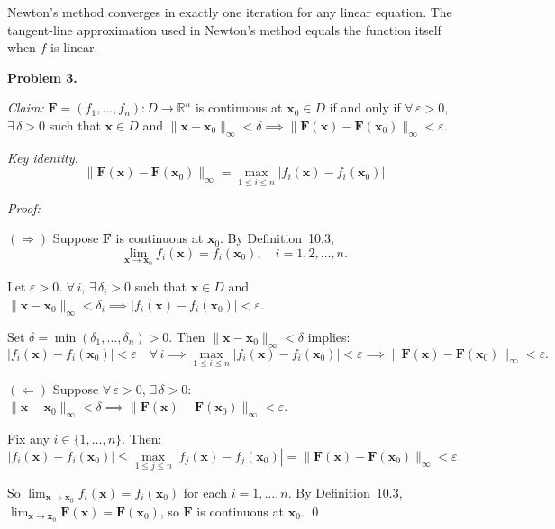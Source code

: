 \documentclass[12pt,letterpaper]{article}
\begin{document}
Newton's method converges in exactly one iteration for any linear equation. The tangent-line approximation used in Newton's method equals the function itself when $f$ is linear.



\textbf{Problem 3.}

\textit{Claim:} $\mathbf{F} = (f_1, \ldots, f_n) : D \to \mathbb{R}^n$ is continuous at $\mathbf{x}_0 \in D$ if and only if $\forall\, \varepsilon > 0$, $\exists\, \delta > 0$ such that $\mathbf{x} \in D$ and $\|\mathbf{x} - \mathbf{x}_0\|_\infty < \delta \implies \|\mathbf{F}(\mathbf{x}) - \mathbf{F}(\mathbf{x}_0)\|_\infty < \varepsilon$.

\textit{Key identity.}
\[
\|\mathbf{F}(\mathbf{x}) - \mathbf{F}(\mathbf{x}_0)\|_\infty = \max_{1 \le i \le n} |f_i(\mathbf{x}) - f_i(\mathbf{x}_0)|
\]

\textit{Proof:}

$(\Longrightarrow)$ Suppose $\mathbf{F}$ is continuous at $\mathbf{x}_0$. By Definition~10.3,
\[
\lim_{\mathbf{x} \to \mathbf{x}_0} f_i(\mathbf{x}) = f_i(\mathbf{x}_0), \quad i = 1, 2, \ldots, n.
\]

Let $\varepsilon > 0$. $\forall\, i$, $\exists\, \delta_i > 0$ such that $\mathbf{x} \in D$ and $\|\mathbf{x} - \mathbf{x}_0\|_\infty < \delta_i \implies |f_i(\mathbf{x}) - f_i(\mathbf{x}_0)| < \varepsilon$.

Set $\delta = \min(\delta_1, \ldots, \delta_n) > 0$. Then $\|\mathbf{x} - \mathbf{x}_0\|_\infty < \delta$ implies:
\[
|f_i(\mathbf{x}) - f_i(\mathbf{x}_0)| < \varepsilon \quad \forall\, i
\implies \max_{1 \le i \le n} |f_i(\mathbf{x}) - f_i(\mathbf{x}_0)| < \varepsilon
\implies \|\mathbf{F}(\mathbf{x}) - \mathbf{F}(\mathbf{x}_0)\|_\infty < \varepsilon.
\]

$(\Longleftarrow)$ Suppose $\forall\, \varepsilon > 0$, $\exists\, \delta > 0$: $\|\mathbf{x} - \mathbf{x}_0\|_\infty < \delta \implies \|\mathbf{F}(\mathbf{x}) - \mathbf{F}(\mathbf{x}_0)\|_\infty < \varepsilon$.

Fix any $i \in \{1, \ldots, n\}$. Then:
\[
|f_i(\mathbf{x}) - f_i(\mathbf{x}_0)| \le \max_{1 \le j \le n} |f_j(\mathbf{x}) - f_j(\mathbf{x}_0)| = \|\mathbf{F}(\mathbf{x}) - \mathbf{F}(\mathbf{x}_0)\|_\infty < \varepsilon.
\]

So $\lim_{\mathbf{x} \to \mathbf{x}_0} f_i(\mathbf{x}) = f_i(\mathbf{x}_0)$ for each $i = 1, \ldots, n$. By Definition~10.3, $\lim_{\mathbf{x} \to \mathbf{x}_0} \mathbf{F}(\mathbf{x}) = \mathbf{F}(\mathbf{x}_0)$, so $\mathbf{F}$ is continuous at $\mathbf{x}_0$. \qed
\end{document}
